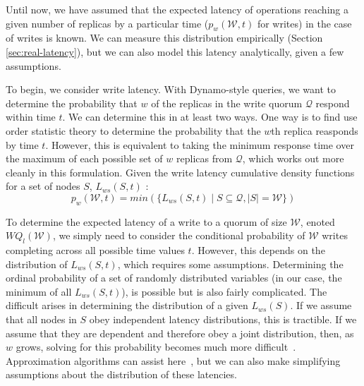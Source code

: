 \documentclass{vldb}
\begin{document}
\label{sec:dynamo-prop}

Until now, we have assumed that the expected latency of operations
reaching a given number of replicas by a particular time
($p_w(\mathcal{W}, t)$ for writes) in the case of writes is known.  We
can measure this distribution empirically (Section
\ref{sec:real-latency}), but we can also model this latency
analytically, given a few assumptions.

To begin, we consider write latency.  With Dynamo-style queries, we
want to determine the probability that $w$ of the replicas in the
write quorum $\mathcal{Q}$ respond within time $t$.  We can determine
this in at least two ways.  One way is to find use order statistic
theory to determine the probability that the $w$th replica reasponds
by time $t$.  However, this is equivalent to taking the minimum
response time over the maximum of each possible set of $w$ replicas
from $\mathcal{Q}$, which works out more cleanly in this formulation.
Given the write latency cumulative density functions for a set of
nodes $S$, $L_{ws}(S, t)$ :
\begin{equation}
p_w(\mathcal{W}, t) = min(\{L_{ws}(S, t) \mid S \subseteq \mathcal{Q}, |S| = \mathcal{W}\})
\end{equation}

To determine the expected latency of a write to a quorum of size
$\mathcal{W}$, enoted $WQ_l(\mathcal{W})$, we simply need to consider
the conditional probability of $\mathcal{W}$ writes completing across
all possible time values $t$.  However, this depends on the
distribution of $L_{ws}(S, t)$, which requires some
assumptions. Determining the ordinal probability of a set of randomly
distributed variables (in our case, the minimum of all $L_{ws}(S,
t)$), is possible but is also fairly complicated.  The difficult
arises in determining the distribution of a given $L_{ws}(S)$.  If we
assume that all nodes in $S$ obey independent latency distributions,
this is tractible.  If we assume that they are dependent and therefore
obey a joint distribution, then, as $w$ grows, solving for this
probability becomes much more difficult~\cite{needed}.  Approximation
algorithms can assist here~\cite{needed}, but we can also make
simplifying assumptions about the distribution of these latencies.
\end{document}
